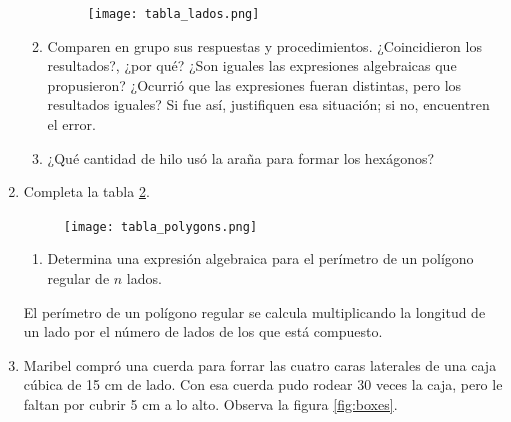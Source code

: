 \documentclass[11pt]{book}
\begin{document}
\begin{enumerate}
\begin{enumerate}
                \begin{figure}[H]
                  \centering
                  \texttt{[image: tabla\_lados.png]}
                  \label{tab:tabla_lados}
                \end{figure}
          \item Comparen en grupo sus respuestas y procedimientos. ¿Coincidieron los resultados?,
                ¿por qué? ¿Son iguales las expresiones algebraicas que propusieron? ¿Ocurrió que
                las expresiones fueran distintas, pero los resultados iguales? Si fue así, justifiquen
                esa situación; si no, encuentren el error.
          \item ¿Qué cantidad de hilo usó la araña para formar los hexágonos?
        \end{enumerate}
  \item Completa la tabla \ref{tab:tabla_polygons}.
        \begin{figure}[H]
          \centering
          \texttt{[image: tabla\_polygons.png]}
          \label{tab:tabla_polygons}
        \end{figure}
        \begin{enumerate}
          \item Determina una expresión algebraica para el perímetro de un polígono regular de $n$ lados.
        \end{enumerate}

        \begin{boxH}
          El perímetro de un polígono regular se calcula multiplicando la longitud de un
          lado por el número de lados de los que está compuesto.
        \end{boxH}

  \item Maribel compró una cuerda para forrar las cuatro caras laterales de una caja cúbica de 15 cm de lado.
        Con esa cuerda pudo rodear 30 veces la caja, pero le faltan
        por cubrir 5 cm a lo alto. Observa la figura \ref{fig:boxes}.


\end{enumerate}
\end{document}
